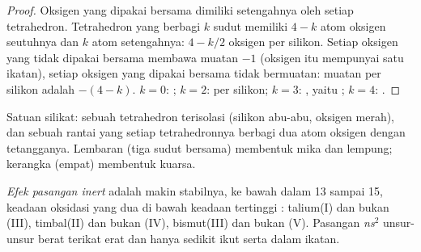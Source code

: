 \begin{proof}
Oksigen yang dipakai bersama dimiliki setengahnya oleh setiap tetrahedron.
Tetrahedron yang berbagi
$k$ sudut memiliki $4 - k$ atom oksigen seutuhnya dan $k$ atom setengahnya: $4 -
k/2$ oksigen per silikon. Setiap oksigen yang tidak dipakai bersama
membawa muatan $-1$ (oksigen itu mempunyai satu ikatan), setiap oksigen
yang dipakai bersama tidak bermuatan: muatan per silikon adalah
$-(4 - k)$. $k = 0$: ; $k = 2$:  per silikon;
$k = 3$: , yaitu ; $k = 4$: .
\end{proof}

\begin{omfigure}

{\small Satuan silikat: sebuah tetrahedron  terisolasi (silikon
abu-abu, oksigen merah), dan sebuah rantai yang setiap tetrahedronnya
berbagi dua atom oksigen dengan tetangganya. Lembaran (tiga sudut
bersama) membentuk mika dan lempung; kerangka (empat) membentuk kuarsa.}
\end{omfigure}

\begin{definition}\label{def:b1:p-block-13-15:inert-pair}
\emph{Efek pasangan inert} adalah makin
stabilnya, ke bawah dalam  13 sampai 15, keadaan oksidasi yang
dua di bawah keadaan tertinggi : talium(I) dan bukan (III),
timbal(II) dan bukan (IV), bismut(III) dan bukan (V). Pasangan
\textit{ns}$^2$ unsur-unsur berat terikat erat dan hanya sedikit ikut
serta dalam ikatan.
\end{definition}

